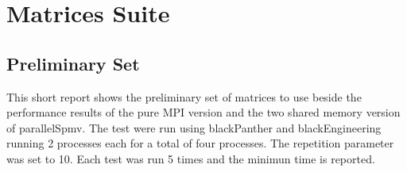 \section{Matrices Suite} \label{matricesSuite}





\subsection*{Preliminary Set}
This short report shows the preliminary set of matrices to use beside the performance results of the pure MPI version and the two shared memory version of parallelSpmv. The test were run using blackPanther and blackEngineering running 2 processes each for a total of four processes. The repetition parameter was set to 10. Each test was run 5 times and the minimun time is reported.


\medskip

